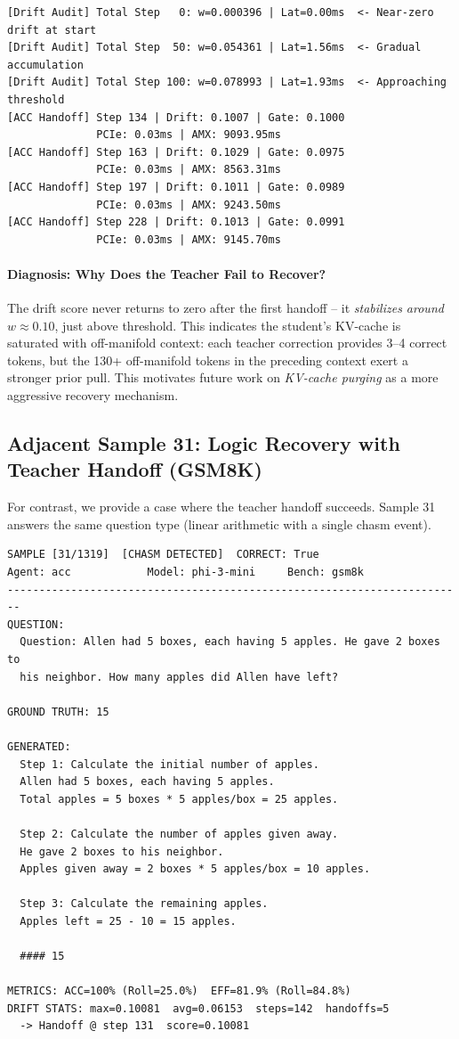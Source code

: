 \documentclass[twoside]{article}
\begin{document}
\begin{lstlisting}[caption={Drift trajectory for Sample 25 -- Drift Audit (step-wise)}]
[Drift Audit] Total Step   0: w=0.000396 | Lat=0.00ms  <- Near-zero drift at start
[Drift Audit] Total Step  50: w=0.054361 | Lat=1.56ms  <- Gradual accumulation
[Drift Audit] Total Step 100: w=0.078993 | Lat=1.93ms  <- Approaching threshold
[ACC Handoff] Step 134 | Drift: 0.1007 | Gate: 0.1000
              PCIe: 0.03ms | AMX: 9093.95ms
[ACC Handoff] Step 163 | Drift: 0.1029 | Gate: 0.0975
              PCIe: 0.03ms | AMX: 8563.31ms
[ACC Handoff] Step 197 | Drift: 0.1011 | Gate: 0.0989
              PCIe: 0.03ms | AMX: 9243.50ms
[ACC Handoff] Step 228 | Drift: 0.1013 | Gate: 0.0991
              PCIe: 0.03ms | AMX: 9145.70ms
\end{lstlisting}

\paragraph{Diagnosis: Why Does the Teacher Fail to Recover?}
The drift score never returns to zero after the first handoff -- it \emph{stabilizes around} $w \approx 0.10$, just above threshold. This indicates the student's KV-cache is saturated with off-manifold context: each teacher correction provides 3--4 correct tokens, but the 130+ off-manifold tokens in the preceding context exert a stronger prior pull. This motivates future work on \emph{KV-cache purging} as a more aggressive recovery mechanism.

\subsection{Adjacent Sample 31: Logic Recovery with Teacher Handoff (GSM8K)}

For contrast, we provide a case where the teacher handoff succeeds. Sample 31 answers the same question type (linear arithmetic with a single chasm event).

\begin{lstlisting}[caption={GSM8K Sample 31 -- Successful Recovery (Phi-3-Mini + ACC)}]
SAMPLE [31/1319]  [CHASM DETECTED]  CORRECT: True
Agent: acc            Model: phi-3-mini     Bench: gsm8k
------------------------------------------------------------------------
QUESTION:
  Question: Allen had 5 boxes, each having 5 apples. He gave 2 boxes to
  his neighbor. How many apples did Allen have left?

GROUND TRUTH: 15

GENERATED:
  Step 1: Calculate the initial number of apples.
  Allen had 5 boxes, each having 5 apples.
  Total apples = 5 boxes * 5 apples/box = 25 apples.

  Step 2: Calculate the number of apples given away.
  He gave 2 boxes to his neighbor.
  Apples given away = 2 boxes * 5 apples/box = 10 apples.

  Step 3: Calculate the remaining apples.
  Apples left = 25 - 10 = 15 apples.

  #### 15

METRICS: ACC=100% (Roll=25.0%)  EFF=81.9% (Roll=84.8%)
DRIFT STATS: max=0.10081  avg=0.06153  steps=142  handoffs=5
  -> Handoff @ step 131  score=0.10081
\end{lstlisting}
\end{document}
